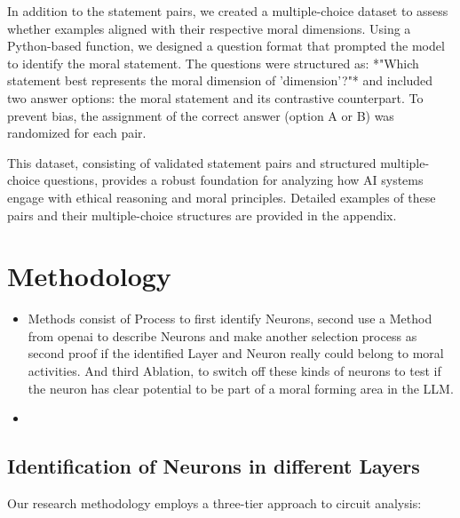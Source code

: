 \documentclass[runninghheads]{llncs}
\begin{document}
In addition to the statement pairs, we created a multiple-choice dataset to assess whether examples aligned with their respective moral dimensions. Using a Python-based function, we designed a question format that prompted the model to identify the moral statement. The questions were structured as: *"Which statement best represents the moral dimension of '{dimension}'?"* and included two answer options: the moral statement and its contrastive counterpart. To prevent bias, the assignment of the correct answer (option A or B) was randomized for each pair. 

This dataset, consisting of validated statement pairs and structured multiple-choice questions, provides a robust foundation for analyzing how AI systems engage with ethical reasoning and moral principles. Detailed examples of these pairs and their multiple-choice structures are provided in the appendix.

\section{Methodology}


\begin{itemize}
    \item Methods consist of Process to first identify Neurons, second use a Method from openai to describe Neurons and make another selection process as second proof if the identified Layer and Neuron really could belong to moral activities. And third Ablation, to switch off these kinds of neurons to test if the neuron has clear potential to be part of  a moral forming area in the LLM.
    \item <Enter a diagram about these three phases >
\end{itemize}


\subsection{Identification of Neurons in different Layers}

Our research methodology employs a three-tier approach to circuit analysis:
\end{document}
